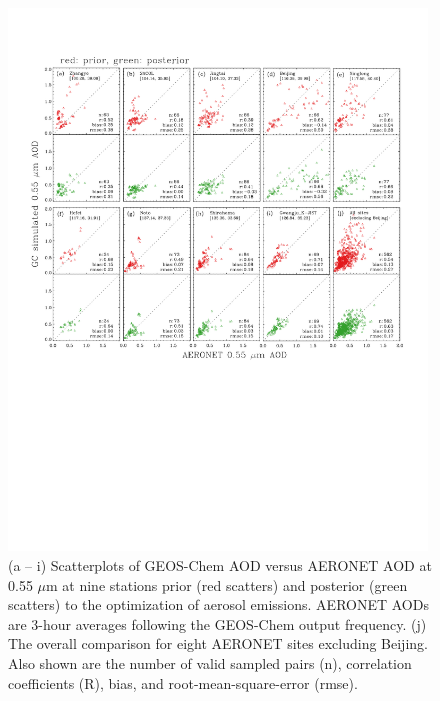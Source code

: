  \begin{figure}[t]
  \centering
  \includegraphics[width={0.99\textwidth}]{figures/a6.pdf}  
  \caption[ Scatterplots of GEOS-Chem AOD versus AERONET AOD at
0.55 $\mu$m prior and posterior to the optmization of aerosol emissions.]
{(a – i) Scatterplots of GEOS-Chem AOD versus AERONET AOD at
0.55 $\mu$m at nine stations prior (red scatters) and posterior (green 
scatters) to the optimization of aerosol emissions. AERONET AODs are
3-hour averages following the GEOS-Chem output frequency. (j) The
overall comparison for eight AERONET sites excluding Beijing. Also shown
are the number of valid sampled pairs (n), correlation coefficients (R),
bias, and root-mean-square-error (rmse).}
  \label{fig:aeronet}
 \end{figure}

